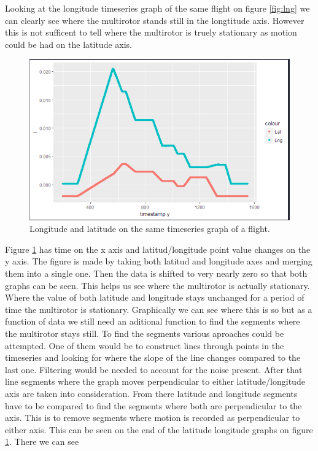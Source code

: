 \documentclass[12pt,oneside]{reedthesis}
\theoremstyle{definition}
\theoremstyle{definition}
\theoremstyle{definition}
\theoremstyle{remark}
\begin{document}
Looking at the longitude timeseries graph of the same flight on figure
\ref{fig:lng} we can clearly see where the multirotor stands still in
the longtitude axis. However this is not sufficent to tell where the
multirotor is truely stationary as motion could be had on the latitude
axis.
\begin{figure}
\centering
\includegraphics{./figure/latlngSamegraph.PNG}
\caption{\label{fig:lnglat}Longitude and latitude on the same timeseries
graph of a flight.}
\end{figure}
Figure \ref{fig:lnglat} has time on the x axis and latitud/longitude
point value changes on the y axis. The figure is made by taking both
latitud and longitude axes and merging them into a single one. Then the
data is shifted to very nearly zero so that both graphs can be seen.
This helps us see where the multirotor is actually stationary. Where the
value of both latitude and longitude stays unchanged for a period of
time the multirotor is stationary. Graphically we can see where this is
so but as a function of data we still need an aditional function to find
the segments where the multirotor stays still. To find the segments
various aproaches could be attempted. One of them would be to construct
lines through points in the timeseries and looking for where the slope
of the line changes compared to the last one. Filtering would be needed
to account for the noise present. After that line segments where the
graph moves perpendicular to either latitude/longitude axis are taken
into consideration. From there latitude and longitude segments have to
be compared to find the segments where both are perpendicular to the
axis. This is to remove segments where motion is recorded as
perpendicular to either axis. This can be seen on the end of the
latitude longitude graphs on figure \ref{fig:lnglat}. There we can see
\end{document}

